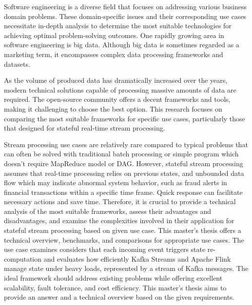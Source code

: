 Software engineering is a diverse field that focuses on addressing various business domain problems.
These domain-specific issues and their corresponding use cases necessitate in-depth analysis to determine
the most suitable technologies for achieving optimal problem-solving outcomes.
One rapidly growing area in software engineering is big data.
Although big data is sometimes regarded as a marketing term, it encompasses complex data processing frameworks and datasets.

As the volume of produced data has dramatically increased over the years,
modern technical solutions capable of processing massive amounts of data are required.
The open-source community offers a decent frameworks and tools, making it challenging to choose the best option.
This research focuses on comparing the most suitable frameworks for specific use cases,
particularly those that designed for stateful real-time stream processing.

Stream processing use cases are relatively rare compared to typical problems that can often
be solved with traditional batch processing or simple program which doesn't require MapReduce
model or DAG.
However, stateful stream processing assumes that real-time processing relies on previous states,
and unbounded data flow which may indicate abnormal system behavior, such as fraud alerts in financial transactions
within a specific time frame.
Quick response can facilitate necessary actions and save time.
Therefore, it is crucial to provide a technical analysis of the most suitable frameworks,
assess their advantages and disadvantages, and examine the complexities involved in their
application for stateful stream processing based on given use case.
This master's thesis offers a technical overview,
benchmarks, and comparisons for appropriate use cases.
The use case examines considers that each incoming event triggers state re-computation and
evaluates how efficiently Kafka Streams and Apache Flink manage state under heavy loads,
represented by a stream of Kafka messages.
The ideal framework should address existing problems while offering excellent scalability,
fault tolerance, and cost efficiency.
This master's thesis aims to provide an answer and a technical overview based on the given requirements.